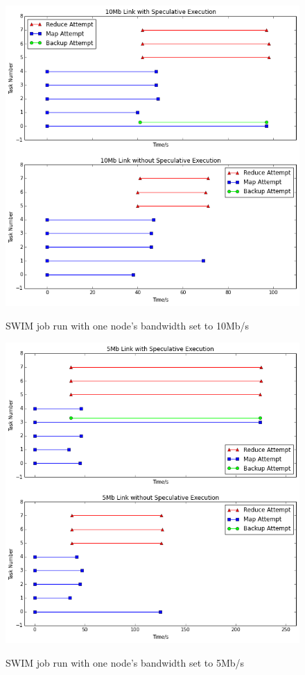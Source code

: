 \documentclass{ucetd}
\begin{document}
\begin{figure}
    {\includegraphics[width=\textwidth]{plots/10Mb.png}}
    \caption[Tests with link bandwidth of 10Mb/s]{SWIM job run with one node's
    bandwidth set to 10Mb/s}
    \label{fig:10Mb}
\end{figure}

\begin{figure}
    {\includegraphics[width=\textwidth]{plots/5Mb.png}}
    \caption[Tests with link bandwidth of 5Mb/s]{SWIM job run with one node's
    bandwidth set to 5Mb/s}
    \label{fig:5Mb}
\end{figure}
\end{document}
